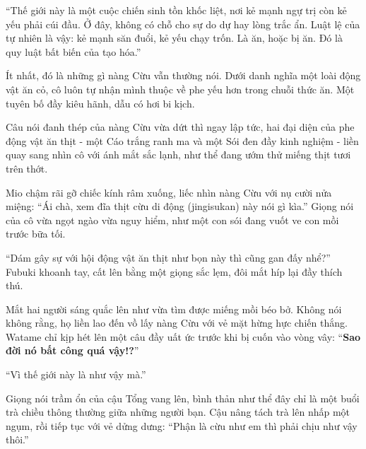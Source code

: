 \documentclass[../main.tex]{subfiles}
\begin{document}

``Thế giới này là một cuộc chiến sinh tồn khốc liệt, nơi kẻ mạnh ngự trị còn kẻ yếu phải cúi đầu. Ở đây, không có chỗ cho sự do dự hay lòng trắc ẩn. Luật lệ của tự nhiên là vậy: kẻ mạnh săn đuổi, kẻ yếu chạy trốn. Là ăn, hoặc bị ăn. Đó là quy luật bất biến của tạo hóa.''

Ít nhất, đó là những gì nàng Cừu vẫn thường nói. Dưới danh nghĩa một loài động vật ăn cỏ, cô luôn tự nhận mình thuộc về phe yếu hơn trong chuỗi thức ăn. Một tuyên bố đầy kiêu hãnh, dẫu có hơi bi kịch.

Câu nói đanh thép của nàng Cừu vừa dứt thì ngay lập tức, hai đại diện của phe động vật ăn thịt - một Cáo trắng ranh ma và một Sói đen đầy kinh nghiệm - liền quay sang nhìn cô với ánh mắt sắc lạnh, như thể đang ướm thử miếng thịt tươi trên thớt.

Mio chậm rãi gỡ chiếc kính râm xuống, liếc nhìn nàng Cừu với nụ cười nửa miệng: ``Ái chà, xem đĩa thịt cừu di động (jingisukan) này nói gì kìa.'' Giọng nói của cô vừa ngọt ngào vừa nguy hiểm, như một con sói đang vuốt ve con mồi trước bữa tối.

``Dám gây sự với hội động vật ăn thịt như bọn này thì cũng gan đấy nhể?'' Fubuki khoanh tay, cất lên bằng một giọng sắc lẹm, đôi mắt híp lại đầy thích thú.


Mắt hai người sáng quắc lên như vừa tìm được miếng mồi béo bở. Không nói không rằng, họ liền lao đến vồ lấy nàng Cừu với vẻ mặt hừng hực chiến thắng. Watame chỉ kịp hét lên một câu đầy uất ức trước khi bị cuốn vào vòng vây: ``\textbf{Sao đời nó bất công quá vậy!?}''

``Vì thế giới này là như vậy mà.''

Giọng nói trầm ổn của cậu Tổng vang lên, bình thản như thể đây chỉ là một buổi trà chiều thông thường giữa những người bạn. Cậu nâng tách trà lên nhấp một ngụm, rồi tiếp tục với vẻ dửng dưng: ``Phận là cừu như em thì phải chịu như vậy thôi.''
\end{document}
